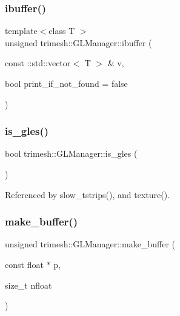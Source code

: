 \subsubsection{\texorpdfstring{ibuffer()}{ibuffer()}\hspace{0.1cm}{\footnotesize\ttfamily [2/2]}}
{\footnotesize\ttfamily template$<$class T $>$ \\
unsigned trimesh\+::\+G\+L\+Manager\+::ibuffer (\begin{DoxyParamCaption}\item[{const \+::std\+::vector$<$ T $>$ \&}]{v,  }\item[{bool}]{print\+\_\+if\+\_\+not\+\_\+found = {\ttfamily false} }\end{DoxyParamCaption})\hspace{0.3cm}{\ttfamily [inline]}}

\mbox{\label{classtrimesh_1_1GLManager_adb060ab8b2a7e36d6ad58cca99e09c33}} 
\subsubsection{\texorpdfstring{is\+\_\+gles()}{is\_gles()}}
{\footnotesize\ttfamily bool trimesh\+::\+G\+L\+Manager\+::is\+\_\+gles (\begin{DoxyParamCaption}{ }\end{DoxyParamCaption})}



Referenced by slow\+\_\+tstrips(), and texture().

\mbox{\label{classtrimesh_1_1GLManager_a3223f2803989ccfea1634412d7d12bd1}} 
\subsubsection{\texorpdfstring{make\+\_\+buffer()}{make\_buffer()}\hspace{0.1cm}{\footnotesize\ttfamily [1/2]}}
{\footnotesize\ttfamily unsigned trimesh\+::\+G\+L\+Manager\+::make\+\_\+buffer (\begin{DoxyParamCaption}\item[{const float $\ast$}]{p,  }\item[{size\+\_\+t}]{nfloat }\end{DoxyParamCaption})}




